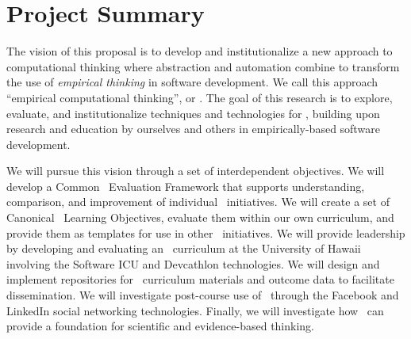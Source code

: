 
\section*{Project Summary}
\renewcommand{\thepage} {A--\arabic{page}}






  The vision of this proposal is to develop and
institutionalize a new approach to computational thinking where abstraction
and automation combine to transform the use of {\em empirical thinking} in
software development.  We call this approach ``empirical computational
thinking'', or \eCT.  The goal of this research is to explore, evaluate,
and institutionalize techniques and technologies for \eCT, building upon
research and education by ourselves and others in empirically-based
software development.

We will pursue this vision through a set of interdependent objectives. We
will develop a Common \eCT\ Evaluation Framework that supports
understanding, comparison, and improvement of individual \eCT\
initiatives. We will create a set of Canonical \eCT\ Learning Objectives,
evaluate them within our own curriculum, and provide them as templates for
use in other \eCT\ initiatives.  We will provide leadership by developing
and evaluating an \eCT\ curriculum at the University of Hawaii involving
the Software ICU and Devcathlon technologies.  We will design and implement
repositories for \eCT\ curriculum materials and outcome data to facilitate
dissemination.  We will investigate post-course use of \eCT\ through the
Facebook and LinkedIn social networking technologies. Finally, we will
investigate how \eCT\ can provide a foundation for scientific and
evidence-based thinking.

